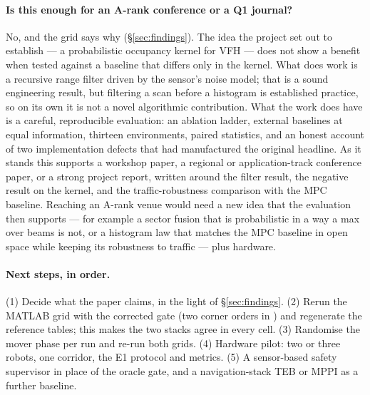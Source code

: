 \paragraph{Is this enough for an A-rank conference or a Q1 journal?} No,
and the grid says why (\S\ref{sec:findings}). The idea the project set
out to establish --- a probabilistic occupancy kernel for VFH --- does not
show a benefit when tested against a baseline that differs only in the
kernel. What does work is a recursive range filter driven by the sensor's
noise model; that is a sound engineering result, but filtering a scan
before a histogram is established practice, so on its own it is not a
novel algorithmic contribution. What the work does have is a careful,
reproducible evaluation: an ablation ladder, external baselines at equal
information, thirteen environments, paired statistics, and an honest
account of two implementation defects that had manufactured the original
headline. As it stands this supports a workshop paper, a regional or
application-track conference paper, or a strong project report, written
around the filter result, the negative result on the kernel, and the
traffic-robustness comparison with the MPC baseline. Reaching an A-rank
venue would need a new idea that the evaluation then supports --- for
example a sector fusion that is probabilistic in a way a max over beams
is not, or a histogram law that matches the MPC baseline in open space
while keeping its robustness to traffic --- plus hardware.

\paragraph{Next steps, in order.} (1) Decide what the paper claims, in the
light of \S\ref{sec:findings}. (2) Rerun the MATLAB grid with the corrected
gate (two corner orders in ) and regenerate
the reference tables; this makes the two stacks agree in every cell. (3)
Randomise the mover phase per run and re-run both grids. (4) Hardware pilot:
two or three robots, one corridor, the E1 protocol and metrics. (5) A
sensor-based safety supervisor in place of the oracle gate, and a
navigation-stack TEB or MPPI as a further baseline.
